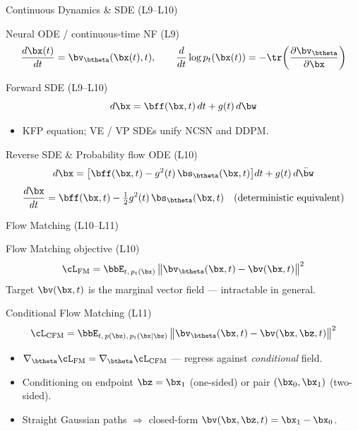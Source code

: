 \documentclass{beamer}
\begin{document}
\begin{frame}{Continuous Dynamics \& SDE (L9--L10)}
	\begin{block}{Neural ODE / continuous-time NF (L9)}
		\vspace{-0.3cm}
		\[
			\frac{d\bx(t)}{dt} = \bv_{\btheta}(\bx(t),t),
			\qquad
			\frac{d}{dt}\log p_t(\bx(t)) = -\tr\!\left(\frac{\partial \bv_{\btheta}}{\partial \bx}\right)
		\]
	\end{block}
	\begin{block}{Forward SDE (L9--L10)}
		\vspace{-0.3cm}
		\[
			d\bx = \bff(\bx,t)\,dt + g(t)\,d\bw
		\]
		\vspace{-0.7cm}
		\begin{itemize}
			\item KFP equation; VE / VP SDEs unify NCSN and DDPM.
		\end{itemize}
	\end{block}
	\begin{block}{Reverse SDE \& Probability flow ODE (L10)}
		\vspace{-0.3cm}
		\[
			d\bx = \bigl[\bff(\bx,t) - g^2(t)\,\bs_{\btheta}(\bx,t)\bigr] dt + g(t)\, d\bar\bw
		\]
		\vspace{-0.6cm}
		\[
			\frac{d\bx}{dt} = \bff(\bx,t) - \tfrac{1}{2}g^2(t)\,\bs_{\btheta}(\bx,t)
			\quad (\text{deterministic equivalent})
		\]
	\end{block}
\end{frame}
\begin{frame}{Flow Matching (L10--L11)}
	\begin{block}{Flow Matching objective (L10)}
		\vspace{-0.3cm}
		\[
			\cL_{\text{FM}} = \bbE_{t,\,p_t(\bx)}\,\bigl\|\bv_{\btheta}(\bx,t) - \bv(\bx,t)\bigr\|^2
		\]
		Target $\bv(\bx,t)$ is the marginal vector field --- intractable in general.
	\end{block}
	\begin{block}{Conditional Flow Matching (L11)}
		\vspace{-0.3cm}
		\[
			\cL_{\text{CFM}} = \bbE_{t,\,p(\bz),\,p_t(\bx|\bz)}\,\bigl\|\bv_{\btheta}(\bx,t) - \bv(\bx,\bz,t)\bigr\|^2
		\]
		\vspace{-0.5cm}
		\begin{itemize}
			\item $\nabla_{\btheta}\cL_{\text{FM}} = \nabla_{\btheta}\cL_{\text{CFM}}$ --- regress against \emph{conditional} field.
			\item Conditioning on endpoint $\bz=\bx_1$ (one-sided) or pair $(\bx_0,\bx_1)$ (two-sided).
			\item Straight Gaussian paths $\Rightarrow$ closed-form $\bv(\bx,\bz,t) = \bx_1 - \bx_0$.
		\end{itemize}
	\end{block}
\end{frame}
\end{document}
